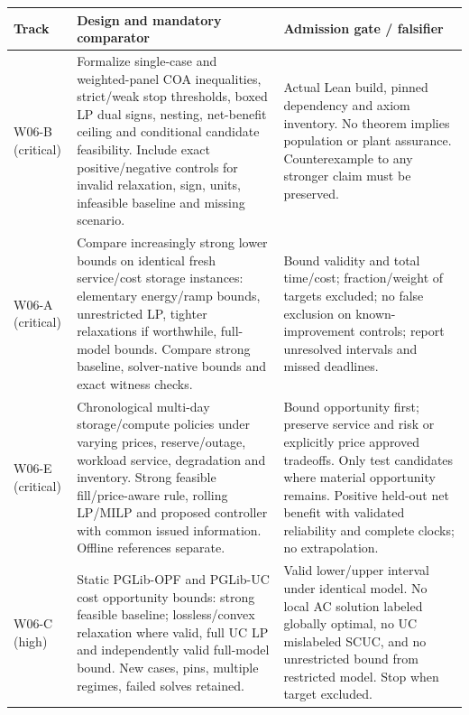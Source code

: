 \documentclass[11pt,letterpaper]{article}
\begin{document}
\begin{longtable}{P{.14\linewidth}P{.43\linewidth}P{.34\linewidth}}
\toprule Track & Design and mandatory comparator & Admission gate / falsifier\\\midrule\endhead
W06-B (critical) & Formalize single-case and weighted-panel COA inequalities, strict/weak stop thresholds, boxed LP dual signs, nesting, net-benefit ceiling and conditional candidate feasibility. Include exact positive/negative controls for invalid relaxation, sign, units, infeasible baseline and missing scenario. & Actual Lean build, pinned dependency and axiom inventory. No theorem implies population or plant assurance. Counterexample to any stronger claim must be preserved.\\
W06-A (critical) & Compare increasingly strong lower bounds on identical fresh service/cost storage instances: elementary energy/ramp bounds, unrestricted LP, tighter relaxations if worthwhile, full-model bounds. Compare strong baseline, solver-native bounds and exact witness checks. & Bound validity and total time/cost; fraction/weight of targets excluded; no false exclusion on known-improvement controls; report unresolved intervals and missed deadlines.\\
W06-E (critical) & Chronological multi-day storage/compute policies under varying prices, reserve/outage, workload service, degradation and inventory. Strong feasible fill/price-aware rule, rolling LP/MILP and proposed controller with common issued information. Offline references separate. & Bound opportunity first; preserve service and risk or explicitly price approved tradeoffs. Only test candidates where material opportunity remains. Positive held-out net benefit with validated reliability and complete clocks; no extrapolation.\\
W06-C (high) & Static PGLib-OPF and PGLib-UC cost opportunity bounds: strong feasible baseline; lossless/convex relaxation where valid, full UC LP and independently valid full-model bound. New cases, pins, multiple regimes, failed solves retained. & Valid lower/upper interval under identical model. No local AC solution labeled globally optimal, no UC mislabeled SCUC, and no unrestricted bound from restricted model. Stop when target excluded.\\\bottomrule
\end{longtable}
\end{document}
